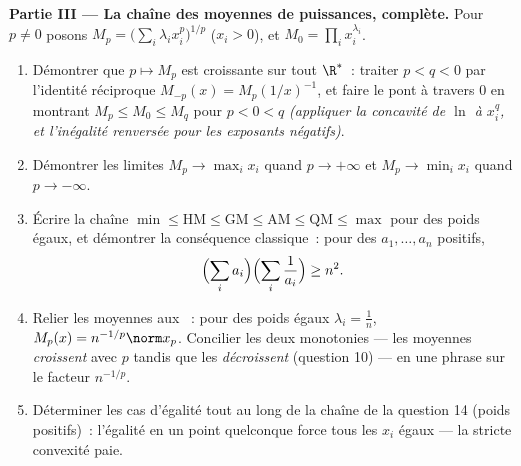 \begin{problem}
\medskip
\noindent\textbf{Partie III --- La chaîne des moyennes de puissances,
complète.} Pour $p \neq 0$ posons $M_p = \bigl(\sum_i\lambda_i
x_i^p\bigr)^{1/p}$ ($x_i > 0$), et $M_0 = \prod_i
x_i^{\lambda_i}$.
\begin{enumerate}[resume]
  \item Démontrer que $p \mapsto M_p$ est croissante sur tout
        $\R^*$~: traiter $p < q < 0$ par l'identité réciproque
        $M_{-p}(x) = M_p(1/x)^{-1}$, et faire le pont à travers $0$
        en montrant $M_p \leq M_0 \leq M_q$ pour $p < 0 < q$
        \emph{(appliquer la concavité de $\ln$ à $x_i^q$, et
        l'inégalité renversée pour les exposants négatifs)}.
  \item Démontrer les limites $M_p \to \max_i x_i$ quand $p \to
        +\infty$ et $M_p \to \min_i x_i$ quand $p \to -\infty$.
  \item Écrire la chaîne $\min \leq \mathrm{HM} \leq
        \mathrm{GM} \leq \mathrm{AM} \leq \mathrm{QM} \leq
        \max$ pour des poids égaux, et démontrer la conséquence
        classique~: pour des $a_1, \dots, a_n$ positifs,
        \[
        \Bigl(\sum_i a_i\Bigr)\Bigl(\sum_i\frac1{a_i}\Bigr)
        \geq n^2 .
        \]
  \item Relier les moyennes aux ~: pour des poids égaux
        $\lambda_i = \frac1n$, $M_p(x) = n^{-1/p}\norm x_p$.
        Concilier les deux monotonies --- les moyennes
        \emph{croissent} avec $p$ tandis que les 
        \emph{décroissent} (question 10) --- en une phrase sur le
        facteur $n^{-1/p}$.
  \item Déterminer les cas d'égalité tout au long de la chaîne de
        la question 14 (poids positifs)~: l'égalité en un point
        quelconque force tous les $x_i$ égaux --- la stricte
        convexité paie.
\end{enumerate}


\end{problem}
